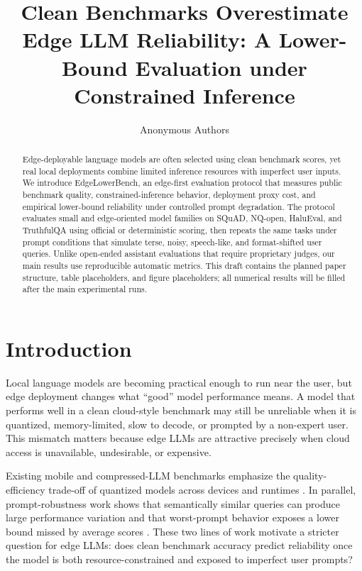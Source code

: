 \documentclass[letterpaper]{article}
\title{Clean Benchmarks Overestimate Edge LLM Reliability: A Lower-Bound Evaluation under Constrained Inference}
\author{
Anonymous Authors
}
\newcommand{\method}{EdgeLowerBench}
\begin{document}
\maketitle

\begin{abstract}
Edge-deployable language models are often selected using clean benchmark scores, yet real local deployments combine limited inference resources with imperfect user inputs. We introduce \method{}, an edge-first evaluation protocol that measures public benchmark quality, constrained-inference behavior, deployment proxy cost, and empirical lower-bound reliability under controlled prompt degradation. The protocol evaluates small and edge-oriented model families on SQuAD, NQ-open, HaluEval, and TruthfulQA using official or deterministic scoring, then repeats the same tasks under prompt conditions that simulate terse, noisy, speech-like, and format-shifted user queries. Unlike open-ended assistant evaluations that require proprietary judges, our main results use reproducible automatic metrics. This draft contains the planned paper structure, table placeholders, and figure placeholders; all numerical results will be filled after the main experimental runs.
\end{abstract}

\section{Introduction}

Local language models are becoming practical enough to run near the user, but edge deployment changes what ``good'' model performance means. A model that performs well in a clean cloud-style benchmark may still be unreliable when it is quantized, memory-limited, slow to decode, or prompted by a non-expert user. This mismatch matters because edge LLMs are attractive precisely when cloud access is unavailable, undesirable, or expensive.

Existing mobile and compressed-LLM benchmarks emphasize the quality-efficiency trade-off of quantized models across devices and runtimes \citep{li2025palmbench}. In parallel, prompt-robustness work shows that semantically similar queries can produce large performance variation and that worst-prompt behavior exposes a lower bound missed by average scores \citep{cao2024worstprompt}. These two lines of work motivate a stricter question for edge LLMs: does clean benchmark accuracy predict reliability once the model is both resource-constrained and exposed to imperfect user prompts?
\end{document}
